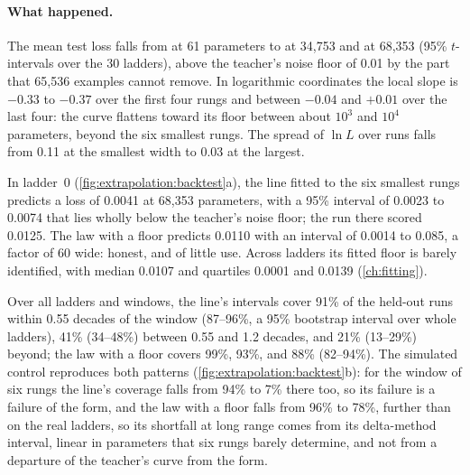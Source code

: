 \begin{refsection}
\paragraph{What happened.} The mean test loss falls from  at 61 parameters to  at 34,753 and  at 68,353 (95\% $t$-intervals over the 30 ladders), above the teacher's noise floor of 0.01 by the part that 65,536 examples cannot remove. In logarithmic coordinates the local slope is $-0.33$ to $-0.37$ over the first four rungs and between $-0.04$ and $+0.01$ over the last four: the curve flattens toward its floor between about $10^3$ and $10^4$ parameters, beyond the six smallest rungs. The spread of $\ln L$ over runs falls from 0.11 at the smallest width to 0.03 at the largest.

In ladder~0 (\cref{fig:extrapolation:backtest}a), the line fitted to the six smallest rungs predicts a loss of 0.0041 at 68,353 parameters, with a 95\% interval of 0.0023 to 0.0074 that lies wholly below the teacher's noise floor; the run there scored 0.0125. The law with a floor predicts 0.0110 with an interval of 0.0014 to 0.085, a factor of 60 wide: honest, and of little use. Across ladders its fitted floor is barely identified, with median 0.0107 and quartiles 0.0001 and 0.0139 (\cref{ch:fitting}).

Over all ladders and windows, the line's intervals cover 91\% of the held-out runs within 0.55 decades of the window (87--96\%, a 95\% bootstrap interval over whole ladders), 41\% (34--48\%) between 0.55 and 1.2 decades, and 21\% (13--29\%) beyond; the law with a floor covers 99\%, 93\%, and 88\% (82--94\%). The simulated control reproduces both patterns (\cref{fig:extrapolation:backtest}b): for the window of six rungs the line's coverage falls from 94\% to 7\% there too, so its failure is a failure of the form, and the law with a floor falls from 96\% to 78\%, further than on the real ladders, so its shortfall at long range comes from its delta-method interval, linear in parameters that six rungs barely determine, and not from a departure of the teacher's curve from the form.


\end{refsection}
